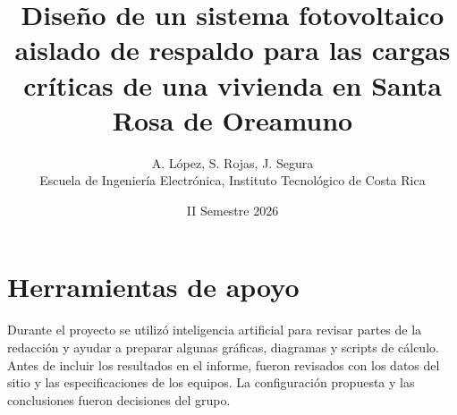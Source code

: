 \documentclass[10pt,letterpaper]{article}
\begin{document}
\title{Diseño de un sistema fotovoltaico aislado de respaldo para las cargas críticas de una vivienda en Santa Rosa de Oreamuno}
\author{A. López, S. Rojas, J. Segura\\[2pt]
\small Escuela de Ingeniería Electrónica, Instituto Tecnológico de Costa Rica}
\date{II Semestre 2026}
\thispagestyle{fancy}
\maketitle
\thispagestyle{fancy}












\section*{Herramientas de apoyo}

Durante el proyecto se utilizó inteligencia artificial para revisar partes de la redacción y ayudar a preparar algunas gráficas, diagramas y scripts de cálculo. Antes de incluir los resultados en el informe, fueron revisados con los datos del sitio y las especificaciones de los equipos. La configuración propuesta y las conclusiones fueron decisiones del grupo.


\end{document}
